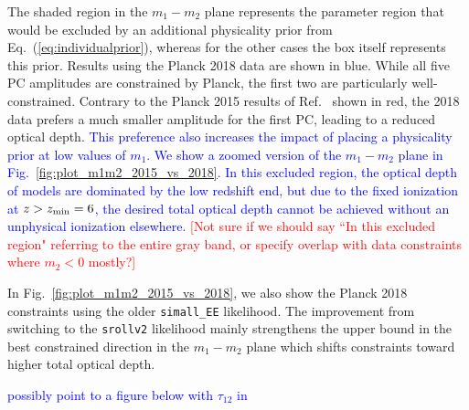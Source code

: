 \documentclass[prd,twocolumn,amsmath,amssymb,floatfix,superscriptaddress,nofootinbib]{revtex4-1}
\newcommand{\wh}[1]{\textcolor{blue}{#1}}
\newcommand{\ch}[1]{\textcolor{red}{#1}}
\begin{document}
%
The shaded region in the $m_1-m_2$ plane represents the parameter region that would be excluded by an additional 
physicality prior from Eq.~(\ref{eq:individualprior}), whereas for the other cases the box itself represents this prior. Results using the Planck 2018 data are shown in blue. While all five PC amplitudes are  constrained by Planck, the first two are particularly well-constrained. Contrary to the Planck 2015 results of Ref.~\cite{Heinrich:2016ojb} shown in red, the 2018 data prefers a much smaller amplitude for the first PC, leading to a reduced optical depth.  \wh{This preference also increases the impact of placing a physicality prior at low values of $m_1$.
We show a zoomed version of the $m_1-m_2$ plane in Fig.~\ref{fig:plot_m1m2_2015_vs_2018}.
In this excluded region, the optical depth of models are dominated by the low redshift end, but due to the fixed ionization at $z>z_{\rm min}=6$, the desired total optical depth cannot be achieved without an unphysical ionization elsewhere.} \ch{[Not sure if we should say ``In this excluded region" referring to the entire gray band, or specify overlap with data constraints where $m_2 < 0$ mostly?]}

In Fig.~\ref{fig:plot_m1m2_2015_vs_2018}, we also show
the Planck 2018 constraints using the older \texttt{simall\_EE} likelihood.  The improvement 
from switching to the \texttt{srollv2} likelihood mainly strengthens the upper bound in the best constrained direction in the $m_1-m_2$ plane which shifts constraints toward higher total optical depth.

\wh{possibly point to a figure below with $\tau_{12}$ in}

\end{document}
